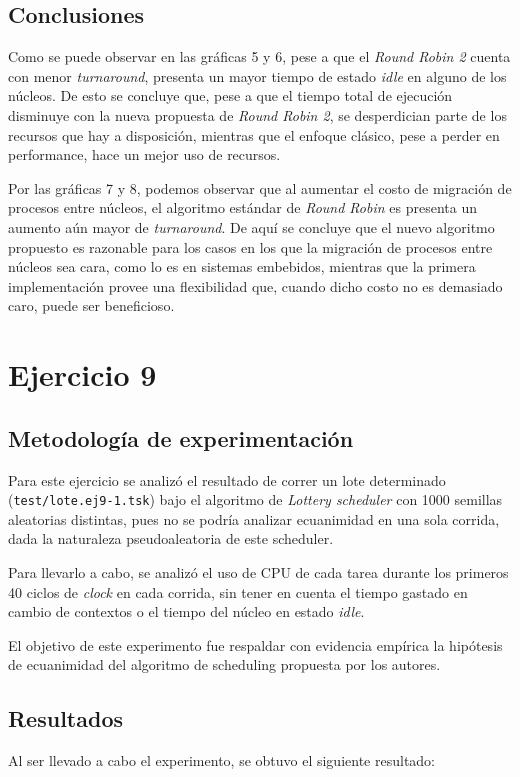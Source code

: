 \documentclass[a4paper]{article}
\begin{document}
\subsection{Conclusiones}

Como se puede observar en las gráficas 5 y 6, pese a que el \textit{Round
Robin 2} cuenta con menor \textit{turnaround}, presenta un mayor tiempo de
estado \textit{idle} en alguno de los núcleos. De esto se concluye que, pese
a que el tiempo total de ejecución disminuye con la nueva propuesta de
\textit{Round Robin 2}, se desperdician parte de los recursos que hay a
disposición, mientras que el enfoque clásico, pese a perder en performance,
hace un mejor uso de recursos.

Por las gráficas 7 y 8, podemos observar que al aumentar el costo de
migración de procesos entre núcleos, el algoritmo estándar de \textit{Round
Robin} es presenta un aumento aún mayor de \textit{turnaround}. De aquí se
concluye que el nuevo algoritmo propuesto es razonable para los casos en los
que la migración de procesos entre núcleos sea cara, como lo es en sistemas
embebidos, mientras que la primera implementación provee una flexibilidad
que, cuando dicho costo no es demasiado caro, puede ser beneficioso.

\section{Ejercicio 9}

\subsection{Metodología de experimentación}
Para este ejercicio se analizó el resultado de correr un lote determinado
(\verb|test/lote.ej9-1.tsk|) bajo el algoritmo de \textit{Lottery
scheduler} con 1000 semillas aleatorias distintas, pues no se podría
analizar ecuanimidad en una sola corrida, dada la naturaleza pseudoaleatoria
de este scheduler.

Para llevarlo a cabo, se analizó el uso de CPU de cada tarea durante los
primeros 40 ciclos de \textit{clock} en cada corrida, sin tener en cuenta el
tiempo gastado en cambio de contextos o el tiempo del núcleo en estado
\textit{idle}.

El objetivo de este experimento fue respaldar con evidencia empírica la
hipótesis de ecuanimidad del algoritmo de scheduling propuesta por los
autores.

\subsection{Resultados}
Al ser llevado a cabo el experimento, se obtuvo el siguiente resultado:
\end{document}
